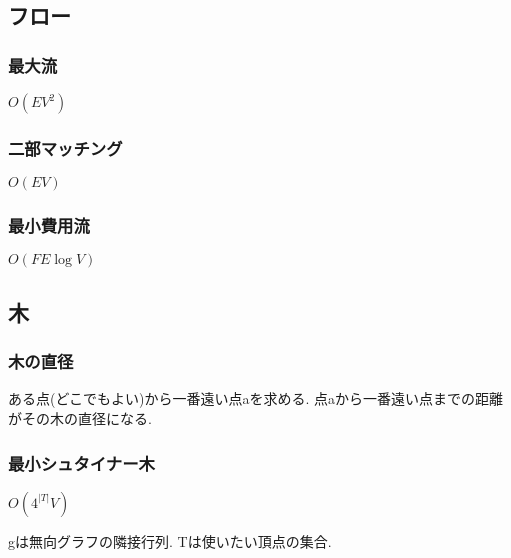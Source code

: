 \documentclass[9pt,twocolumn,a4paper,landscape]{extarticle}
\begin{document}
\subsection{フロー}
\subsubsection{最大流}
$O(EV^2)$\par


\subsubsection{二部マッチング}
$O(EV)$\par


\subsubsection{最小費用流}
$O(FE\log{V})$\par


\subsection{木}
\subsubsection{木の直径}
ある点(どこでもよい)から一番遠い点aを求める. 点aから一番遠い点までの距離がその木の直径になる.\par
\subsubsection{最小シュタイナー木}
$O(4^{|T|}V)$ \par
gは無向グラフの隣接行列. Tは使いたい頂点の集合.\par

\end{document}
